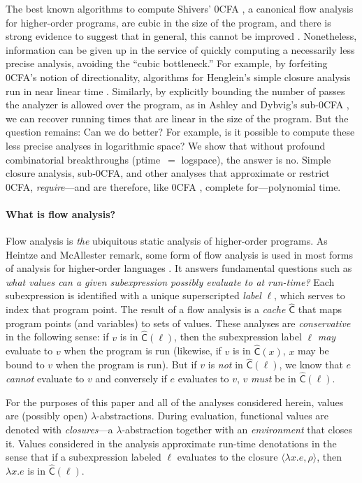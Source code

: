\documentclass{llncs}
\newcommand\ptime{{\sc ptime}}
\newcommand\logspace{{\sc logspace}}
\newcommand\cache{\widehat{\mathsf{C}}}
\begin{document}
The best known algorithms to compute Shivers' 0CFA \cite{shivers-88},
a canonical flow analysis for higher-order programs, are cubic in the
size of the program, and there is strong evidence to suggest that in
general, this cannot be improved \cite{heintze-mcallester-97b}.
Nonetheless, information can be given up in the service of quickly
computing a necessarily less precise analysis, avoiding the ``cubic
bottleneck.''  For example, by forfeiting 0CFA's notion of
directionality, algorithms for Henglein's simple closure analysis run
in near linear time \cite{henglein92d}.  Similarly, by explicitly
bounding the number of passes the analyzer is allowed over the
program, as in Ashley and Dybvig's sub-0CFA \cite{ashley-dybvig}, we
can recover running times that are linear in the size of the program.
But the question remains: Can we do better?  For example, is it
possible to compute these less precise analyses in logarithmic space?
We show that without profound combinatorial breakthroughs (\ptime\ $=$
\logspace), the answer is no.  Simple closure analysis, sub-0CFA, and
other analyses that approximate or restrict 0CFA, {\em require}---and
are therefore, like 0CFA \cite{vanhorn-mairson-07}, complete
for---polynomial time.


\paragraph{What is flow analysis?}

Flow analysis is {\em the} ubiquitous static analysis of higher-order
programs.  As Heintze and McAllester remark, some form of flow
analysis is used in most forms of analysis for higher-order languages
\cite{heintze-mcallester-97a}.  It answers fundamental questions such
as {\em what values can a given subexpression possibly evaluate to at
run-time?}  Each subexpression is identified with a unique
superscripted {\em label} $\ell$, which serves to index that program
point.  The result of a flow analysis is a {\em cache} $\cache$ that
maps program points (and variables) to sets of values.  These analyses
are {\em conservative} in the following sense: if $v$ is in
$\cache(\ell)$, then the subexpression label $\ell$ {\em may} evaluate
to $v$ when the program is run (likewise, if $v$ is in $\cache(x)$,
$x$ may be bound to $v$ when the program is run).  But if $v$ is {\em
not} in $\cache(\ell)$, we know that $e$ {\em cannot} evaluate to $v$
and conversely if $e$ evaluates to $v$, $v$ {\em must} be in
$\cache(\ell)$.

For the purposes of this paper and all of the analyses considered
herein, values are (possibly open) $\lambda$-abstractions.  During
evaluation, functional values are denoted with {\em closures}---a
$\lambda$-abstraction together with an {\em environment} that closes
it.  Values considered in the analysis approximate run-time
denotations in the sense that if a subexpression labeled $\ell$
evaluates to the closure $\langle \lambda x.e,\rho\rangle$, then
$\lambda x.e$ is in $\cache(\ell)$.
\end{document}
